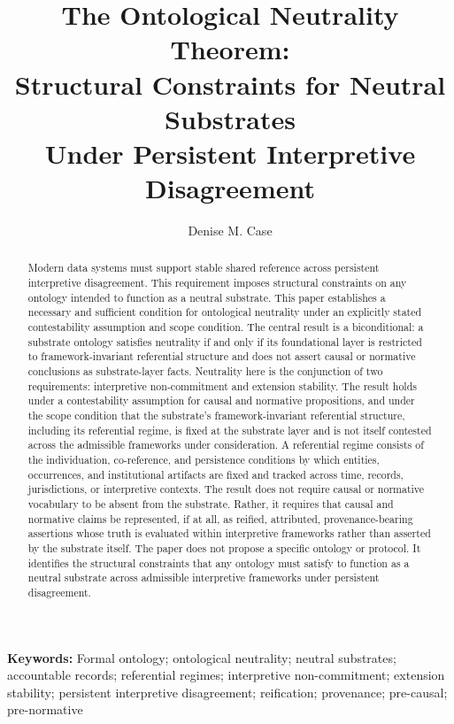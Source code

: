 \documentclass[11pt]{article}
\title{
The Ontological Neutrality Theorem:\\
Structural Constraints for Neutral Substrates\\
Under Persistent Interpretive Disagreement
}
\author{Denise M. Case}
\affil{\small Department of Computer Science and Information Systems\\
Northwest Missouri State University, Maryville, MO, USA\\}
\date{}
\theoremstyle{plain}
\theoremstyle{definition}
\theoremstyle{remark}
\providecommand{\keywords}[1]{\vspace{0.5em}\noindent\textbf{Keywords: }\small #1}
\begin{document}
\maketitle
\vspace{-2em}

\begin{abstract}
  Modern data systems must support stable shared reference
  across persistent interpretive disagreement.
  This requirement imposes structural constraints
  on any ontology intended to function as a neutral substrate.
  This paper establishes a necessary and sufficient condition
  for ontological neutrality under an explicitly stated
  contestability assumption and scope condition.
  The central result is a biconditional:
  a substrate ontology satisfies neutrality if and only if its foundational
  layer is restricted to framework-invariant referential structure and does
  not assert causal or normative conclusions as substrate-layer facts.
  Neutrality here is the conjunction of two requirements:
  interpretive non-commitment and extension stability.
  The result holds under a contestability assumption for causal and
  normative propositions, and
  under the scope condition
  that the substrate's framework-invariant referential structure,
  including its referential regime, is fixed at the substrate layer
  and is not itself contested
  across the admissible frameworks under consideration.
  A referential regime consists of the individuation, co-reference, and
  persistence conditions by which entities, occurrences, and institutional
  artifacts are fixed and tracked across time, records, jurisdictions, or
  interpretive contexts.
  The result does not require causal or normative vocabulary to be absent
  from the substrate.
  Rather, it requires that causal and normative claims be represented, if at all,
  as reified, attributed, provenance-bearing assertions whose truth is evaluated
  within interpretive frameworks rather than asserted by the substrate itself.
  The paper does not propose a specific ontology or protocol.
  It identifies the structural constraints that any ontology must satisfy
  to function as a neutral substrate across admissible interpretive
  frameworks under persistent disagreement.
\end{abstract}

\keywords{
  Formal ontology;
  ontological neutrality;
  neutral substrates;
  accountable records;
  referential regimes;
  interpretive non-commitment;
  extension stability;
  persistent interpretive disagreement;
  reification;
  provenance;
  pre-causal;
  pre-normative
}
\end{document}

